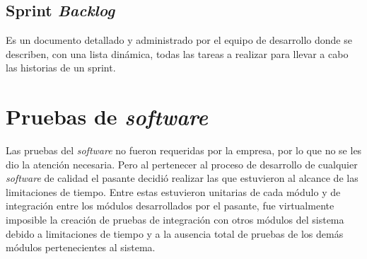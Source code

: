 \subsection{Sprint \emph{Backlog}}
Es un documento detallado y administrado por el equipo de desarrollo donde se describen, con una lista dinámica, todas las tareas a realizar para llevar a cabo las historias de un sprint.

\section{Pruebas de \emph{software}}

Las pruebas del \emph{software} no fueron requeridas por la empresa, por lo que no se les dio la atención necesaria. Pero al pertenecer al proceso de desarrollo de cualquier \emph{software} de calidad el pasante decidió realizar las que estuvieron al alcance de las limitaciones de tiempo. Entre estas estuvieron unitarias de cada módulo y de integración entre los módulos desarrollados por el pasante, fue virtualmente imposible la creación de pruebas de integración con otros módulos del sistema debido a limitaciones de tiempo y a la ausencia total de pruebas de los demás módulos pertenecientes al sistema.

